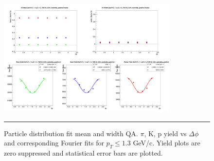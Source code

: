 \begin{figure}[htbp!]
  \centering
    \includegraphics[width=0.8\textwidth]{lowptfits/fitParams_tof1_cent0_ch1_pT-11-13.jpg}
    \rule{35em}{0.5pt}
  \caption[Particle distribution fit mean and width QA. $\pi$, K, p yield vs $\Delta \phi$ and corresponding Fourier fits for $p_T\leq 1.3$ GeV/c.]{Particle distribution fit mean and width QA. $\pi$, K, p yield vs $\Delta \phi$ and corresponding Fourier fits for $p_T\leq 1.3$ GeV/c. Yield plots are zero suppressed and statistical error bars are plotted.}
  \label{fig:yieldphisinglegaus}
\end{figure}

